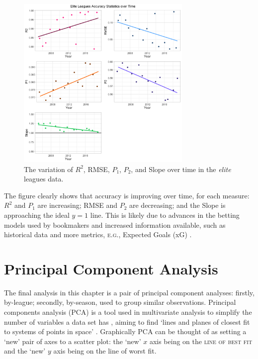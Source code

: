 \documentclass[a4paper,10pt]{report}
\begin{document}
\begin{figure}[h!]\begin{center}
	\includegraphics[width=0.75\textwidth]{elite_06_seasontimeplot.png}
	\caption{The variation of $R^2$, RMSE, $P_1$, $P_2$, and Slope over time in the \textit{elite} leagues data.}\label{FIG:01_06_seasontime}
\end{center}\end{figure}\vspace{3mm}

The figure clearly shows that accuracy is improving over time, for each measure: $R^2$ and $P_1$ are increasing; RMSE and $P_2$ are decreasing; and the Slope is approaching the ideal $y=1$ line. This is likely due to advances in the betting models used by bookmakers and increased information available, such as historical data and more metrics, \textsc{e.g.}, Expected Goals (xG) \autocite{xgoals}.

\pagebreak

\section{Principal Component Analysis}\label{sec:elitepca}
The final analysis in this chapter is a pair of principal component analyses: firstly, by-league; secondly, by-season, used to group similar observations. Principal components analysis (PCA) is a tool used in multivariate analysis to simplify the number of variables a data set has \autocite{wold87}, aiming to find `lines and planes of closest fit to systems of points in space' \autocite{pearson1901}. Graphically PCA can be thought of as setting a `new' pair of axes to a scatter plot: the `new' $x$ axis being on the \textsc{line of best fit} and the `new' $y$ axis being on the line of worst fit. 
\end{document}
